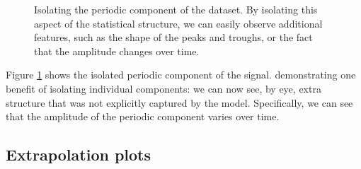 \documentclass{article} %
\begin{document}
\begin{figure}[h!]
\centering
{}
\caption{Isolating the periodic component of the dataset.  By isolating this aspect of the statistical structure, we can easily observe additional features, such as the shape of the peaks and troughs, or the fact that the amplitude changes over time.}
\label{fig:periodic}
\end{figure}

Figure \ref{fig:periodic} shows the isolated periodic component of the signal.  demonstrating one benefit of isolating individual components: we can now see, by eye, extra structure that was not explicitly captured by the model.  Specifically, we can see that the amplitude of the periodic component varies over time.


\subsection{Extrapolation plots}
\end{document}
